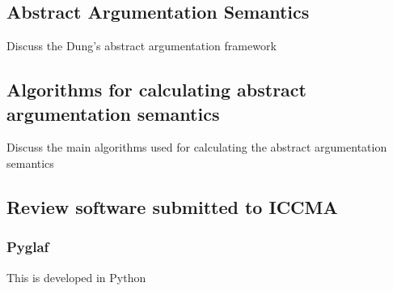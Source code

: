 \subsection{Abstract Argumentation Semantics}
Discuss the Dung's abstract argumentation framework


\subsection{Algorithms for calculating abstract argumentation semantics}
Discuss the main algorithms used for calculating the abstract argumentation semantics

\subsection{Review software submitted to ICCMA}
\subsubsection{Pyglaf}

This is developed in Python